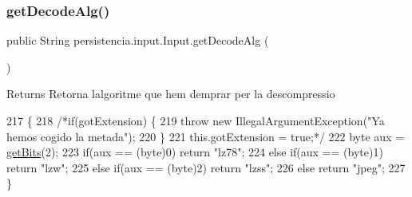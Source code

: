 \mbox{\label{classpersistencia_1_1input_1_1Input_a95e2068bd17e415f0487f8193f066160}} 
\subsubsection{\texorpdfstring{get\+Decode\+Alg()}{getDecodeAlg()}}
{\footnotesize\ttfamily public String persistencia.\+input.\+Input.\+get\+Decode\+Alg (\begin{DoxyParamCaption}{ }\end{DoxyParamCaption})\hspace{0.3cm}{\ttfamily [inline]}}

\begin{DoxyReturn}{Returns}
Retorna l\textquotesingle{}algoritme que hem d\textquotesingle{}emprar per la descompressio 
\end{DoxyReturn}

\begin{DoxyCode}
217     \{
218         \textcolor{comment}{/*if(gotExtension) \{}
219 \textcolor{comment}{            throw new IllegalArgumentException("Ya hemos cogido la metada");}
220 \textcolor{comment}{        \}}
221 \textcolor{comment}{        this.gotExtension = true;*/}
222         byte aux = \hyperlink{classpersistencia_1_1input_1_1Input_a3fa5a378b2155a3022a4a4ef38d63a8e}{getBits}(2);
223         \textcolor{keywordflow}{if}(aux == (byte)0) \textcolor{keywordflow}{return} \textcolor{stringliteral}{"lz78"};
224         \textcolor{keywordflow}{else} \textcolor{keywordflow}{if}(aux == (byte)1) \textcolor{keywordflow}{return} \textcolor{stringliteral}{"lzw"};
225         \textcolor{keywordflow}{else} \textcolor{keywordflow}{if}(aux == (byte)2) \textcolor{keywordflow}{return} \textcolor{stringliteral}{"lzss"};
226         \textcolor{keywordflow}{else} \textcolor{keywordflow}{return} \textcolor{stringliteral}{"jpeg"};
227     \}
\end{DoxyCode}
\mbox{\label{classpersistencia_1_1input_1_1Input_aa45459b94e501548a7b223d24b560ad0}} 
